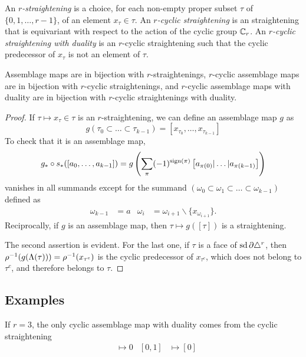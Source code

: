 \begin{definition}
	An \emph{$r$-straightening} is a choice, for each non-empty proper subset $\tau$ of $\{0,1,\dots,r-1\}$, of an element $x_\tau\in \tau$. An \emph{$r$-cyclic straightening} is an straightening that is equivariant with respect to the action of the cyclic group $\mathbb{C}_r$. An \emph{$r$-cyclic straightening with duality} is an $r$-cyclic straightening such that the cyclic predecessor of $x_\tau$ is not an element of $\tau$.
\end{definition}

\begin{proposition}\label{prop:straightenings}
	Assemblage maps are in bijection with $r$-straightenings, $r$-cyclic assemblage maps are in bijection with $r$-cyclic straightenings, and $r$-cyclic assemblage maps with duality are in bijection with $r$-cyclic straightenings with duality.
\end{proposition}

\begin{proof}
	If $\tau\mapsto x_{\tau}\in \tau$ is an $r$-straightening, we can define an assemblage map $g$ as
	\[
	g(\tau_0\subset\dots\subset\tau_{k-1}) = [x_{\tau_0},\dots,x_{\tau_{k-1}}]
	\]
	To check that it is an assemblage map,
	\[
	g_*\circ s_*([a_0,\dots,a_{k-1}]) = g\left(\sum_{\pi} (-1)^{\operatorname{sign}(\pi)} \left[a_{\pi(0)}|\dots|a_{\pi(k-1)}\right]\right)
	\]
	vanishes in all summands except for the summand $(\omega_0 \subset \omega_1 \subset \dots \subset \omega_{k-1})$ defined as
	\begin{align*}
		\omega_{k-1} &= a
		&
		\omega_{i} &= \omega_{i+1}\smallsetminus \{x_{\omega_{i+1}}\}.
	\end{align*}
	Reciprocally, if $g$ is an assemblage map, then $\tau\mapsto g([\tau])$ is a straightening.
	
	The second assertion is evident. For the last one, if $\tau$ is a face of $\operatorname{sd} \partial \triangle^{r}$, then $\rho^{-1}(g(\Lambda(\tau))) = \rho^{-1}(x_{\tau^c})$ is the cyclic predecessor of $x_{\tau^c}$, which does not belong to $\tau^c$, and therefore belongs to $\tau$.
\end{proof}

\subsection{Examples}

\begin{example}
	If $r=3$, the only cyclic assemblage map with duality comes from the cyclic straightening
	\begin{align*}
		[0]&\mapsto 0 & [0,1]&\mapsto [0]
	\end{align*}
\end{example}

